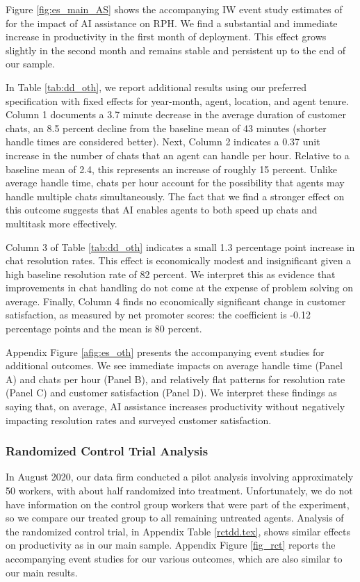 \documentclass[11pt]{article}
\begin{document}
Figure \ref{fig:es_main_AS} shows the accompanying IW event study estimates of \citet{sun_estimating_2020} for the impact of AI assistance on RPH.  We find a substantial and immediate increase in productivity in the first month of deployment.  This effect grows slightly in the second month and remains stable and persistent up to the end of our sample. 

In Table \ref{tab:dd_oth}, we report additional results using our preferred specification with fixed effects for year-month, agent, location, and agent tenure.  Column 1 documents a 3.7 minute decrease in the average duration of customer chats, an 8.5 percent decline from the baseline mean of 43 minutes (shorter handle times are considered better).  Next, Column 2 indicates a 0.37 unit increase in the number of chats that an agent can handle per hour.  Relative to a baseline mean of 2.4, this represents an increase of roughly 15 percent.  Unlike average handle time, chats per hour account for the possibility that agents may handle multiple chats simultaneously.  The fact that we find a stronger effect on this outcome suggests that AI enables agents to both speed up chats and multitask more effectively.

Column 3 of Table \ref{tab:dd_oth} indicates a small 1.3 percentage point increase in chat resolution rates.  This effect is economically modest and insignificant given a high baseline resolution rate of 82 percent. We interpret this as evidence that improvements in chat handling do not come at the expense of problem solving on average.  Finally, Column 4 finds no economically significant change in customer satisfaction, as measured by net promoter scores: the coefficient is -0.12 percentage points and the mean is 80 percent. 

Appendix Figure \ref{afig:es_oth} presents the accompanying event studies for additional outcomes.  We see immediate impacts on average handle time (Panel A) and chats per hour (Panel B), and relatively flat patterns for resolution rate (Panel C) and customer satisfaction (Panel D).  We interpret these findings as saying that, on average, AI assistance increases productivity without negatively impacting resolution rates and surveyed customer satisfaction. 

\subsubsection{Randomized Control Trial Analysis} \label{sec:rct}

In August 2020, our data firm conducted a pilot analysis involving approximately 50 workers, with about half randomized into treatment. Unfortunately, we do not have information on the control group workers that were part of the experiment, so we compare our treated group to all remaining untreated agents. Analysis of the randomized control trial, in Appendix Table \ref{rctdd.tex}, shows similar effects on productivity as in our main sample. Appendix Figure \ref{fig_rct} reports the accompanying event studies for our various outcomes, which are also similar to our main results.  
\end{document}
